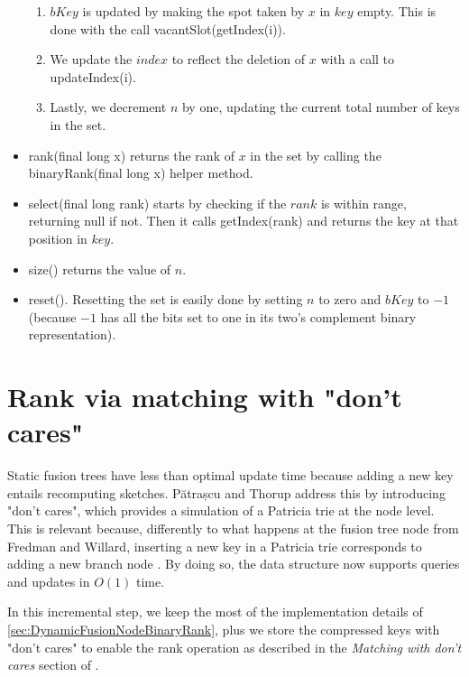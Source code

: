 \begin{itemize}
\begin{enumerate}
        \item
        $bKey$ is updated by making the spot taken by $x$ in $key$ empty. This is done with the call {\ttfamily vacantSlot(getIndex(i))}.
        
        \item
        We update the $index$ to reflect the deletion of $x$ with a call to {\ttfamily updateIndex(i)}.
        
        \item
        Lastly, we decrement $n$ by one, updating the current total number of keys in the set.
    \end{enumerate}
    
    \item
    {\ttfamily rank(final long x)} returns the rank of $x$ in the set by calling the {\ttfamily binaryRank(final long x)} helper method.
    
    \item
    {\ttfamily select(final long rank)} starts by checking if the $rank$ is within range, returning {\ttfamily null} if not. Then it calls {\ttfamily getIndex(rank)} and returns the key at that position in $key$.
    
    \item
    {\ttfamily size()} returns the value of $n$.
    
    \item
    {\ttfamily reset()}.
    Resetting the set is easily done by setting $n$ to zero and $bKey$ to $-1$ (because $-1$ has all the bits set to one in its two's complement binary representation).
\end{itemize}

\newpage
\section{Rank via matching with "don't cares"} \label{sec:rankWithDontCares}

Static fusion trees have less than optimal update time because adding a new key entails recomputing sketches. Pătrașcu and Thorup address this by introducing "don't cares", which provides a simulation of a Patricia trie at the node level. This is relevant because, differently to what happens at the fusion tree node from Fredman and Willard, inserting a new key in a Patricia trie corresponds to adding a new branch node \cite{patrascu2014dynamic}. By doing so, the data structure now supports queries and updates in $O(1)$ time.

In this incremental step, we keep the most of the implementation details of \ref{sec:DynamicFusionNodeBinaryRank}, plus we store the compressed keys with "don't cares" to enable the rank operation as described in the \textit{Matching with don't cares} section of \cite{patrascu2014dynamic}.

